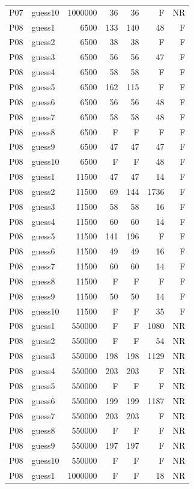 {\begin{longtable}{llrrrrr}
P07 & guess10 & 1000000 & 36 & 36 & F & NR \\
P08 & guess1 & 6500 & 133 & 140 & 48 & F \\
P08 & guess2 & 6500 & 38 & 38 & F & F \\
P08 & guess3 & 6500 & 56 & 56 & 47 & F \\
P08 & guess4 & 6500 & 58 & 58 & F & F \\
P08 & guess5 & 6500 & 162 & 115 & F & F \\
P08 & guess6 & 6500 & 56 & 56 & 48 & F \\
P08 & guess7 & 6500 & 58 & 58 & 48 & F \\
P08 & guess8 & 6500 & F & F & F & F \\
P08 & guess9 & 6500 & 47 & 47 & 47 & F \\
P08 & guess10 & 6500 & F & F & 48 & F \\
P08 & guess1 & 11500 & 47 & 47 & 14 & F \\
P08 & guess2 & 11500 & 69 & 144 & 1736 & F \\
P08 & guess3 & 11500 & 58 & 58 & 16 & F \\
P08 & guess4 & 11500 & 60 & 60 & 14 & F \\
P08 & guess5 & 11500 & 141 & 196 & F & F \\
P08 & guess6 & 11500 & 49 & 49 & 16 & F \\
P08 & guess7 & 11500 & 60 & 60 & 14 & F \\
P08 & guess8 & 11500 & F & F & F & F \\
P08 & guess9 & 11500 & 50 & 50 & 14 & F \\
P08 & guess10 & 11500 & F & F & 35 & F \\
P08 & guess1 & 550000 & F & F & 1080 & NR \\
P08 & guess2 & 550000 & F & F & 54 & NR \\
P08 & guess3 & 550000 & 198 & 198 & 1129 & NR \\
P08 & guess4 & 550000 & 203 & 203 & F & NR \\
P08 & guess5 & 550000 & F & F & F & NR \\
P08 & guess6 & 550000 & 199 & 199 & 1187 & NR \\
P08 & guess7 & 550000 & 203 & 203 & F & NR \\
P08 & guess8 & 550000 & F & F & F & NR \\
P08 & guess9 & 550000 & 197 & 197 & F & NR \\
P08 & guess10 & 550000 & F & F & F & NR \\
P08 & guess1 & 1000000 & F & F & 18 & NR \\

\end{longtable}}
